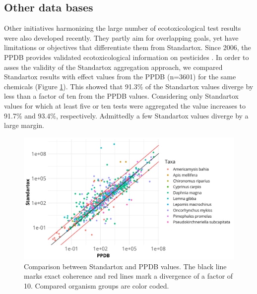 \subsection*{Other data bases}
Other initiatives harmonizing the large number of ecotoxicological test results were also developed recently. They partly aim for overlapping goals, yet have limitations or objectives that differentiate them from Standartox. Since 2006, the PPDB provides validated ecotoxicological information on pesticides \citep{lewis_international_2016}. In order to asses the validity of the Standartox aggregation approach, we compared Standartox results with effect values from the PPDB (n=3601) for the same chemicals (Figure \ref{fig:standartox_ppdb_diff}). This showed that 91.3\% of the Standartox values diverge by less than a factor of ten from the PPDB values. Considering only Standartox values for which at least five or ten tests were aggregated the value increases to 91.7\% and 93.4\%, respectively. Admittedly a few Standartox values diverge by a large margin.

\begin{figure}
    \includegraphics[width=1\linewidth]{article/figures/gg_ppdb_stan_compare_continous.png}
    \caption{Comparison between Standartox and PPDB values. The black line marks exact coherence and red lines mark a divergence of a factor of 10. Compared organism groups are color coded.}
    \label{fig:standartox_ppdb_diff}
\end{figure}

